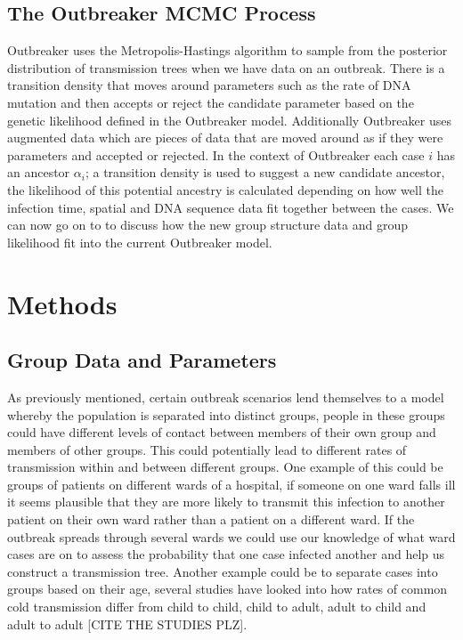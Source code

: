\documentclass[11pt,a4paper]{report}
\begin{document}
\section{The Outbreaker MCMC Process}
Outbreaker uses the Metropolis-Hastings algorithm to sample from the posterior distribution of transmission trees when we have data on an outbreak. There is a transition density that moves around parameters such as the rate of DNA mutation and then accepts or reject the candidate parameter based on the genetic likelihood defined in the Outbreaker model. Additionally Outbreaker uses augmented data which are pieces of data that are moved around as if they were parameters and accepted or rejected. In the context of Outbreaker each case $i$ has an ancestor $\alpha_i$; a transition density is used to suggest a new candidate ancestor, the likelihood of this potential ancestry is calculated depending on how well the infection time, spatial and DNA sequence data fit together between the cases. We can now go on to to discuss how the new group structure data and group likelihood fit into the current Outbreaker model.


\chapter{Methods}
\section{Group Data and Parameters}
As previously mentioned, certain outbreak scenarios lend themselves to a model whereby the population is separated into distinct groups, people in these groups could have different levels of contact between members of their own group and members of other groups. This could potentially lead to different rates of transmission within and between different groups. One example of this could be groups of patients on different wards of a hospital, if someone on one ward falls ill it seems plausible that they are more likely to transmit this infection to another patient on their own ward rather than a patient on a different ward. If the outbreak spreads through several wards we could use our knowledge of what ward cases are on to assess the probability that one case infected another and help us construct a transmission tree. Another example could be to separate cases into groups based on their age, several studies have looked into how rates of common cold transmission differ from child to child, child to adult, adult to child and adult to adult [CITE THE STUDIES PLZ].
\end{document}
